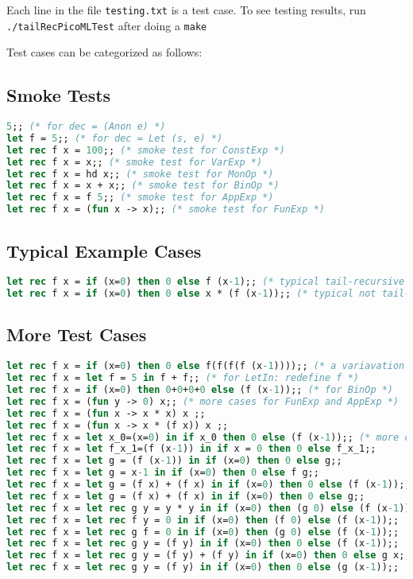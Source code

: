 Each line in the file \texttt{testing.txt} is a test case. 
To see testing results, run \texttt{./tailRecPicoMLTest} after doing a  \texttt{make}

Test cases can be categorized as follows:

\subsection{Smoke Tests}

\begin{lstlisting}[language=Caml, caption=Smoke Tests]
5;; (* for dec = (Anon e) *)
let f = 5;; (* for dec = Let (s, e) *)
let rec f x = 100;; (* smoke test for ConstExp *)
let rec f x = x;; (* smoke test for VarExp *)
let rec f x = hd x;; (* smoke test for MonOp *)
let rec f x = x + x;; (* smoke test for BinOp *)
let rec f x = f 5;; (* smoke test for AppExp *)
let rec f x = (fun x -> x);; (* smoke test for FunExp *)
\end{lstlisting}

\subsection{Typical Example Cases}

\begin{lstlisting}[language=Caml, caption=Typical Example Cases]
let rec f x = if (x=0) then 0 else f (x-1);; (* typical tail-recursive example *)
let rec f x = if (x=0) then 0 else x * (f (x-1));; (* typical not tail-recursive example *)
\end{lstlisting}

\subsection{More Test Cases}

\begin{lstlisting}[language=Caml, caption=More Test Cases]
let rec f x = if (x=0) then 0 else f(f(f(f (x-1))));; (* a variavation of typical tail-recursive example *)
let rec f x = let f = 5 in f + f;; (* for LetIn: redefine f *)
let rec f x = if (x=0) then 0+0+0+0 else (f (x-1));; (* for BinOp *)
let rec f x = (fun y -> 0) x;; (* more cases for FunExp and AppExp *)
let rec f x = (fun x -> x * x) x ;;
let rec f x = (fun x -> x * (f x)) x ;;
let rec f x = let x_0=(x=0) in if x_0 then 0 else (f (x-1));; (* more cases for LetIn *)
let rec f x = let f_x_1=(f (x-1)) in if x = 0 then 0 else f_x_1;;
let rec f x = let g = (f (x-1)) in if (x=0) then 0 else g;;
let rec f x = let g = x-1 in if (x=0) then 0 else f g;;
let rec f x = let g = (f x) + (f x) in if (x=0) then 0 else (f (x-1));;
let rec f x = let g = (f x) + (f x) in if (x=0) then 0 else g;;
let rec f x = let rec g y = y * y in if (x=0) then (g 0) else (f (x-1));; (* more cases for LetRecIn *)
let rec f x = let rec f y = 0 in if (x=0) then (f 0) else (f (x-1));;
let rec f x = let rec g f = 0 in if (x=0) then (g 0) else (f (x-1));;
let rec f x = let rec g y = (f y) in if (x=0) then 0 else (f (x-1));;
let rec f x = let rec g y = (f y) + (f y) in if (x=0) then 0 else g x;;
let rec f x = let rec g y = (f y) in if (x=0) then 0 else (g (x-1));;
\end{lstlisting}


